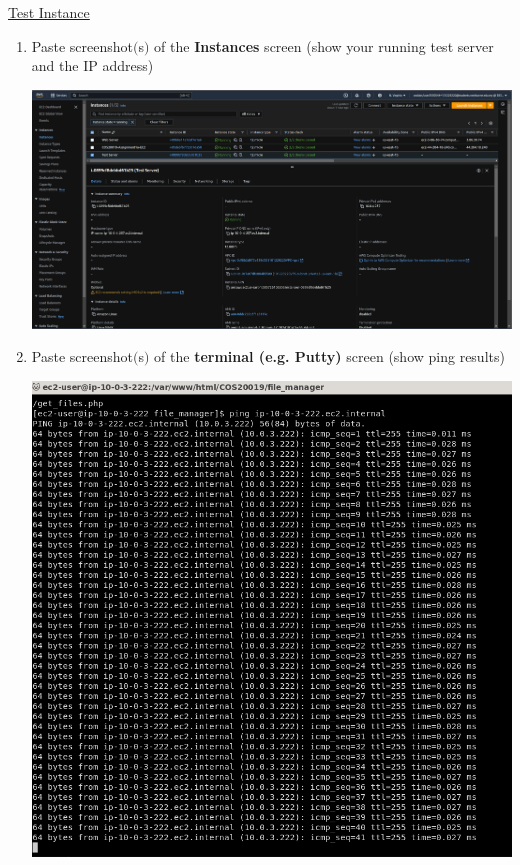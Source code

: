 \documentclass[11pt]{article}
\begin{document}
\newpage

\noindent\underline{Test Instance}

\vspace{0.01cm}

\begin{enumerate}[resume]
    \item Paste screenshot$($s$)$ of the \textbf{Instances} screen (show your running test server and the IP address)\\
    \vspace{-0.02mm}

    {\centering
    \includegraphics[width=5.8in]{pics/40.png}
    }    
        

    
    \item Paste screenshot$($s$)$ of the \textbf{terminal (e.g. Putty)} screen (show ping results)\\
    \vspace{0.1mm}    

    {\centering
    \includegraphics[width=5.0in]{pics/41.png}
    }    
        
\end{enumerate}
\end{document}
